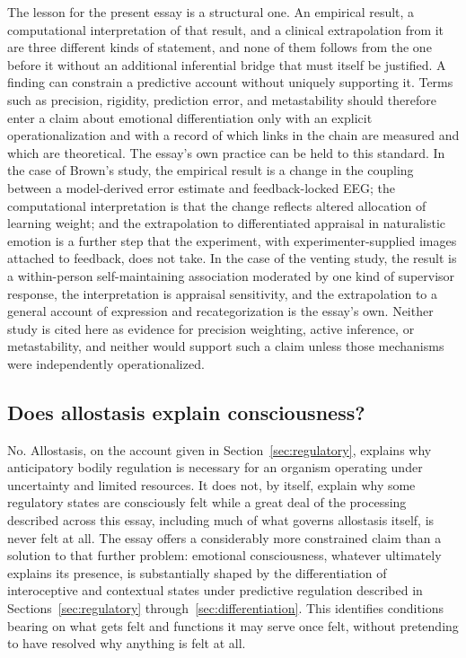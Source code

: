 \documentclass[11pt]{article}
\begin{document}
The lesson for the present essay is a structural one. An empirical result, a computational interpretation of that result, and a clinical extrapolation from it are three different kinds of statement, and none of them follows from the one before it without an additional inferential bridge that must itself be justified. A finding can constrain a predictive account without uniquely supporting it. Terms such as precision, rigidity, prediction error, and metastability should therefore enter a claim about emotional differentiation only with an explicit operationalization and with a record of which links in the chain are measured and which are theoretical. The essay's own practice can be held to this standard. In the case of Brown's study, the empirical result is a change in the coupling between a model-derived error estimate and feedback-locked EEG; the computational interpretation is that the change reflects altered allocation of learning weight; and the extrapolation to differentiated appraisal in naturalistic emotion is a further step that the experiment, with experimenter-supplied images attached to feedback, does not take. In the case of the venting study, the result is a within-person self-maintaining association moderated by one kind of supervisor response, the interpretation is appraisal sensitivity, and the extrapolation to a general account of expression and recategorization is the essay's own. Neither study is cited here as evidence for precision weighting, active inference, or metastability, and neither would support such a claim unless those mechanisms were independently operationalized.

\subsection{Does allostasis explain consciousness?}

No. Allostasis, on the account given in Section~\ref{sec:regulatory}, explains why anticipatory bodily regulation is necessary for an organism operating under uncertainty and limited resources. It does not, by itself, explain why some regulatory states are consciously felt while a great deal of the processing described across this essay, including much of what governs allostasis itself, is never felt at all. The essay offers a considerably more constrained claim than a solution to that further problem: emotional consciousness, whatever ultimately explains its presence, is substantially shaped by the differentiation of interoceptive and contextual states under predictive regulation described in Sections~\ref{sec:regulatory} through~\ref{sec:differentiation}. This identifies conditions bearing on what gets felt and functions it may serve once felt, without pretending to have resolved why anything is felt at all.
\end{document}
